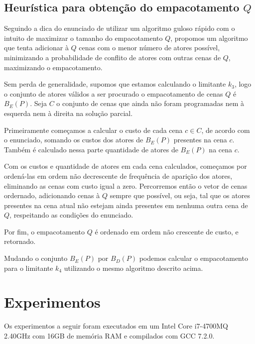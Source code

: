 \documentclass[a4paper,11pt]{article}
\begin{document}
\subsection{Heurística para obtenção do empacotamento $Q$}
Seguindo a dica do enunciado de utilizar um algoritmo guloso rápido com o intuito
de maximizar o tamanho do empacotamento $Q$, propomos um algoritmo que tenta
adicionar à $Q$ cenas com o menor número de atores possível, minimizando a probabilidade
de conflito de atores com outras cenas de $Q$, maximizando o empacotamento.

Sem perda de generalidade, supomos que estamos calculando o
limitante $k_3$, logo o conjunto de atores válidos a ser procurado o empacotamento
de cenas $Q$ é $B_E(P)$. Seja $C$ o conjunto de cenas que ainda não foram programadas nem à esquerda nem
à direita na solução parcial.

Primeiramente começamos a calcular o custo de cada cena $c \in C$, de acordo com
o enunciado, somando os custos dos atores de $B_E(P)$ presentes na cena $c$. Também
é calculado nessa parte quantidade de atores de $B_E(P)$ na cena $c$.

Com os custos e quantidade de atores em cada cena calculados, começamos por ordená-las
em ordem não decrescente de frequência de aparição dos atores, eliminando
as cenas com custo igual a zero. Percorremos então o vetor de cenas ordernado,
adicionando cenas à $Q$ sempre que possível, ou seja, tal que os atores presentes
na cena atual não estejam ainda presentes em nenhuma outra cena de $Q$, respeitando as condições
do enunciado.

Por fim, o empacotamento $Q$ é ordenado em ordem não crescente de custo, e retornado.

Mudando o conjunto $B_E(P)$ por $B_D(P)$ podemos calcular o empacotamento para o
limitante $k_4$ utilizando o mesmo algoritmo descrito acima.

\section{Experimentos}
Os experimentos a seguir foram executados em um Intel Core i7-4700MQ 2.40GHz com
16GB de memória RAM e compilados com GCC 7.2.0.
\end{document}
